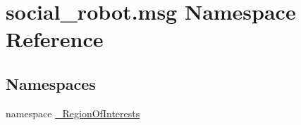 \hypertarget{namespacesocial__robot_1_1msg}{\section{social\-\_\-robot.\-msg Namespace Reference}
\label{namespacesocial__robot_1_1msg}
}
\subsection*{Namespaces}
\begin{DoxyCompactItemize}
\item 
namespace \hyperlink{namespacesocial__robot_1_1msg_1_1__RegionOfInterests}{\-\_\-\-Region\-Of\-Interests}
\end{DoxyCompactItemize}
